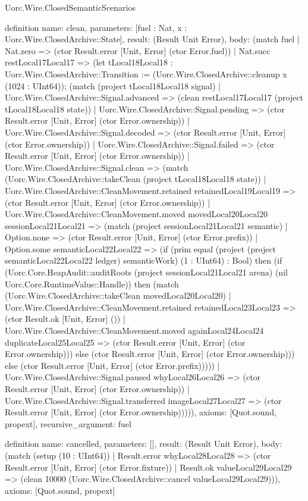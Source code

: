 \begin{lexlean}{Uorc.Wire.ClosedSemanticScenarios}
\begin{semanticmodule}
definition{
  name: clean,
  parameters: [fuel : Nat, x : Uorc.Wire.ClosedArchive::State],
  result: (Result Unit Error),
  body: (match fuel
    | Nat.zero => (ctor Result.error [Unit, Error] (ctor Error.fuel))
    | Nat.succ restLocal17Local17 => (let tLocal18Local18 : Uorc.Wire.ClosedArchive::Transition := (Uorc.Wire.ClosedArchive::cleanup x (1024 : UInt64)); (match (project tLocal18Local18 signal)
      | Uorc.Wire.ClosedArchive::Signal.advanced => (clean restLocal17Local17 (project tLocal18Local18 state))
      | Uorc.Wire.ClosedArchive::Signal.pending => (ctor Result.error [Unit, Error] (ctor Error.ownership))
      | Uorc.Wire.ClosedArchive::Signal.decoded => (ctor Result.error [Unit, Error] (ctor Error.ownership))
      | Uorc.Wire.ClosedArchive::Signal.failed => (ctor Result.error [Unit, Error] (ctor Error.ownership))
      | Uorc.Wire.ClosedArchive::Signal.clean => (match (Uorc.Wire.ClosedArchive::takeClean (project tLocal18Local18 state))
        | Uorc.Wire.ClosedArchive::CleanMovement.retained retainedLocal19Local19 => (ctor Result.error [Unit, Error] (ctor Error.ownership))
        | Uorc.Wire.ClosedArchive::CleanMovement.moved movedLocal20Local20 sessionLocal21Local21 => (match (project sessionLocal21Local21 semantic)
          | Option.none => (ctor Result.error [Unit, Error] (ctor Error.prefix))
          | Option.some semanticLocal22Local22 => (if (prim equal (project (project semanticLocal22Local22 ledger) semanticWork) (1 : UInt64) : Bool) then (if (Uorc.Core.HeapAudit::auditRoots (project sessionLocal21Local21 arena) (nil Uorc.Core.RuntimeValue::Handle)) then (match (Uorc.Wire.ClosedArchive::takeClean movedLocal20Local20)
            | Uorc.Wire.ClosedArchive::CleanMovement.retained retainedLocal23Local23 => (ctor Result.ok [Unit, Error] ())
            | Uorc.Wire.ClosedArchive::CleanMovement.moved againLocal24Local24 duplicateLocal25Local25 => (ctor Result.error [Unit, Error] (ctor Error.ownership))) else (ctor Result.error [Unit, Error] (ctor Error.ownership))) else (ctor Result.error [Unit, Error] (ctor Error.prefix)))))
      | Uorc.Wire.ClosedArchive::Signal.paused whyLocal26Local26 => (ctor Result.error [Unit, Error] (ctor Error.ownership))
      | Uorc.Wire.ClosedArchive::Signal.transferred imageLocal27Local27 => (ctor Result.error [Unit, Error] (ctor Error.ownership))))),
  axioms: [Quot.sound, propext],
  recursive_argument: fuel
}

definition{
  name: cancelled,
  parameters: [],
  result: (Result Unit Error),
  body: (match (setup (10 : UInt64))
    | Result.error whyLocal28Local28 => (ctor Result.error [Unit, Error] (ctor Error.fixture))
    | Result.ok valueLocal29Local29 => (clean 10000 (Uorc.Wire.ClosedArchive::cancel valueLocal29Local29))),
  axioms: [Quot.sound, propext]
}


\end{semanticmodule}
\end{lexlean}
